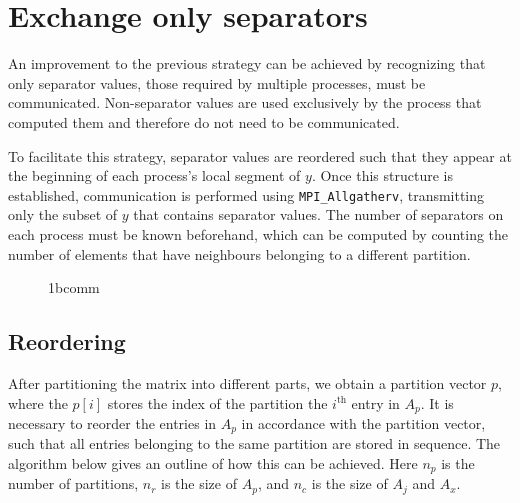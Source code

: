 \section{Exchange only separators}

An improvement to the previous strategy can be achieved by recognizing that only separator values, those required by multiple processes, must be communicated. Non-separator values are used exclusively by the process that computed them and therefore do not need to be communicated.

To facilitate this strategy, separator values are reordered such that they appear at the beginning of each process's local segment of \(y\). Once this structure is established, communication is performed using \texttt{MPI\_Allgatherv}, transmitting only the subset of \(y\) that contains separator values. The number of separators on each process must be known beforehand, which can be computed by counting the number of elements that have neighbours belonging to a different partition.

\begin{figure}[ht]
    \centering
    \caption{1bcomm}
    \label{fig:1bcomm}
\end{figure}


\subsection{Reordering}
After partitioning the matrix into different parts, we obtain a partition vector \(p\), where the \(p[i]\) stores the index of the partition the \(i^{\text{th}}\) entry in \(A_{p}\). It is necessary to reorder the entries in \(A_{p}\) in accordance with the partition vector, such that all entries belonging to the same partition are stored in sequence. The algorithm below gives an outline of how this can be achieved. Here \(n_{p}\) is the number of partitions, \(n_{r}\) is the size of \(A_{p}\), and \(n_{c}\) is the size of \(A_{j}\) and \(A_{x}\).

